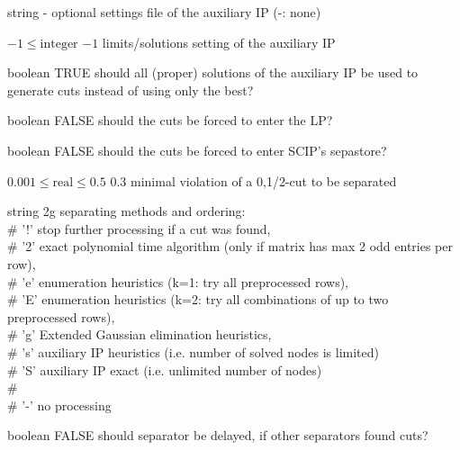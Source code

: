 %
{string}%
{-}%
{optional settings file of the auxiliary IP (-: none)}%
{}

%
{$-1\leq\textrm{integer}$}%
{$-1$}%
{limits/solutions setting of the auxiliary IP}%
{}

%
{boolean}%
{TRUE}%
{should all (proper) solutions of the auxiliary IP be used to generate cuts instead of using only the best?}%
{}

%
{boolean}%
{FALSE}%
{should the cuts be forced to enter the LP?}%
{}

%
{boolean}%
{FALSE}%
{should the cuts be forced to enter SCIP's sepastore?}%
{}

%
{$0.001\leq\textrm{real}\leq0.5$}%
{$0.3$}%
{minimal violation of a {0,1/2}-cut to be separated}%
{}

%
{string}%
{2g}%
{separating methods and ordering:\\   \#                      '!' stop further processing if a cut was found,\\   \#                      '2' exact polynomial time algorithm (only if matrix has max 2 odd entries per row),\\   \#                      'e' enumeration heuristics (k=1: try all preprocessed rows),\\   \#                      'E' enumeration heuristics (k=2: try all combinations of up to two preprocessed rows),\\   \#                      'g' Extended Gaussian elimination heuristics,\\   \#                      's' auxiliary IP heuristics (i.e. number of solved nodes is limited)\\   \#                      'S' auxiliary IP exact      (i.e. unlimited number of nodes)\\   \#                      \\   \#                      '-' no processing}%
{}

%
{boolean}%
{FALSE}%
{should separator be delayed, if other separators found cuts?}%
{}

